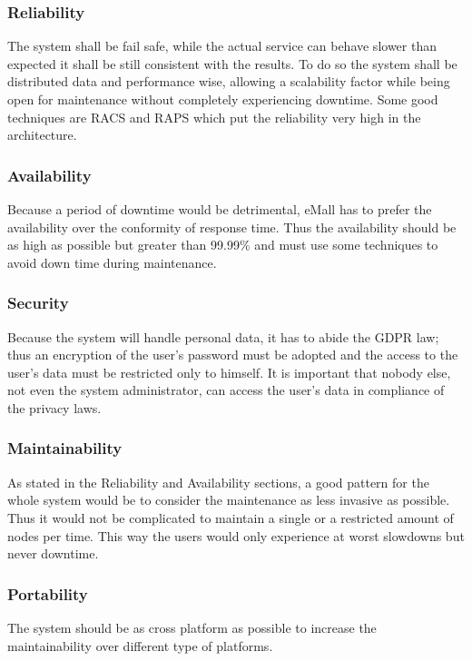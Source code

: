 \subsubsection{Reliability}
The system shall be fail safe, while the actual service can behave slower than expected it shall be still consistent with the results.
To do so the system shall be distributed data and performance wise, allowing a scalability factor while being open for maintenance without completely experiencing downtime.
Some good techniques are \ac{RACS} and \ac{RAPS} which put the reliability very high in the architecture.
\subsubsection{Availability}
Because a period of downtime would be detrimental, eMall has to prefer the availability over the conformity of response time.
Thus the availability should be as high as possible but greater than 99.99\% and must use some techniques to avoid down time during maintenance.
\subsubsection{Security}
Because the system will handle personal data, it has to abide the \ac{GDPR} law; thus an encryption of the user's password must be adopted and the access to the user's data must be restricted only to himself.
It is important that nobody else, not even the system administrator, can access the user's data in compliance of the privacy laws.\\
\subsubsection{Maintainability}
As stated in the Reliability and Availability sections, a good pattern for the whole system would be to consider the maintenance as less invasive as possible. Thus it would not be complicated to maintain a single or a restricted amount of nodes per time. This way the users would only experience at worst slowdowns but never downtime.
\subsubsection{Portability}
The system should be as cross platform as possible to increase the maintainability over different type of platforms.
\clearpage